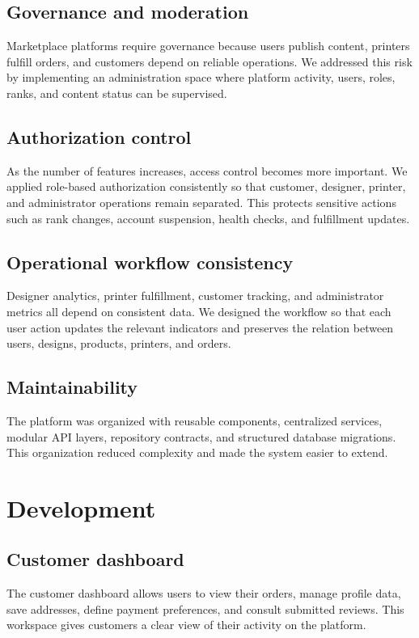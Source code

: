 \subsection{Governance and moderation}
Marketplace platforms require governance because users publish content, printers fulfill orders, and customers depend on reliable operations.
We addressed this risk by implementing an administration space where platform activity, users, roles, ranks, and content status can be supervised.

\subsection{Authorization control}
As the number of features increases, access control becomes more important.
We applied role-based authorization consistently so that customer, designer, printer, and administrator operations remain separated.
This protects sensitive actions such as rank changes, account suspension, health checks, and fulfillment updates.

\subsection{Operational workflow consistency}
Designer analytics, printer fulfillment, customer tracking, and administrator metrics all depend on consistent data.
We designed the workflow so that each user action updates the relevant indicators and preserves the relation between users, designs, products, printers, and orders.

\subsection{Maintainability}
The platform was organized with reusable components, centralized services, modular API layers, repository contracts, and structured database migrations.
This organization reduced complexity and made the system easier to extend.

\section{Development}
\subsection{Customer dashboard}
The customer dashboard allows users to view their orders, manage profile data, save addresses, define payment preferences, and consult submitted reviews.
This workspace gives customers a clear view of their activity on the platform.

